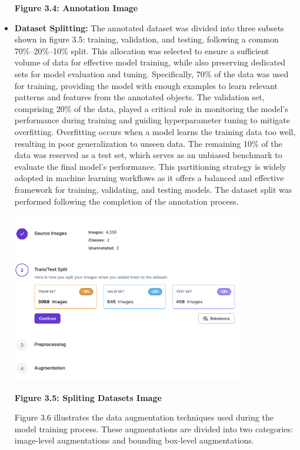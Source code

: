 \begin{itemize}
\begin{center}
		\vspace{0.5em}
		\textbf{Figure 3.4: Annotation Image}
	\end{center}
	\item \textbf{Dataset Splitting:}  The annotated dataset was divided into three subsets shown in figure 3.5: training, validation, and testing, following a common 70\%–20\%–10\% split. This allocation was selected to ensure a sufficient volume of data for effective model training, while also preserving dedicated sets for model evaluation and tuning. Specifically, 70\% of the data was used for training, providing the model with enough examples to learn relevant patterns and features from the annotated objects. The validation set, comprising 20\% of the data, played a critical role in monitoring the model's performance during training and guiding hyperparameter tuning to mitigate overfitting. Overfitting occurs when a model learns the training data too well, resulting in poor generalization to unseen data. The remaining 10\% of the data was reserved as a test set, which serves as an unbiased benchmark to evaluate the final model's performance. This partitioning strategy is widely adopted in machine learning workflows as it offers a balanced and effective framework for training, validating, and testing models. The dataset split was performed following the completion of the annotation process.
	\begin{center}
		\includegraphics[width=0.8\textwidth]{Split.png}
		
		\vspace{0.5em}
		\textbf{Figure 3.5: Spliting Datasets Image}
	\end{center}
	\noindent\hspace{2.5em}Figure 3.6 illustrates the data augmentation techniques used during the model training process. These augmentations are divided into two categories: image-level augmentations and bounding box-level augmentations.
	

\end{itemize}

